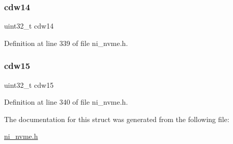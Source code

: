 \subsubsection{\texorpdfstring{cdw14}{cdw14}}
{\footnotesize\ttfamily uint32\+\_\+t cdw14}



Definition at line 339 of file ni\+\_\+nvme.\+h.

\mbox{\label{struct__ni__nvme__command__t_a129a86603541eb2540156ee93ef472da}} 
\subsubsection{\texorpdfstring{cdw15}{cdw15}}
{\footnotesize\ttfamily uint32\+\_\+t cdw15}



Definition at line 340 of file ni\+\_\+nvme.\+h.



The documentation for this struct was generated from the following file\+:\begin{DoxyCompactItemize}
\item 
\mbox{\hyperlink{ni__nvme_8h}{ni\+\_\+nvme.\+h}}\end{DoxyCompactItemize}

